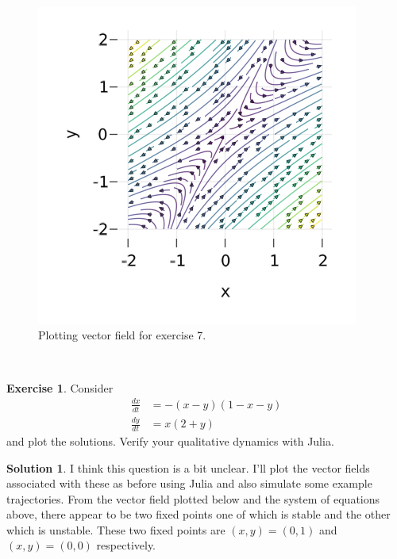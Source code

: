 \documentclass[12pt]{article}
\theoremstyle{definition}
\newtheorem{exer}{Exercise}
\newtheorem{sol}{Solution}
\theoremstyle{remark}
\begin{document}
  \begin{figure}[h]
     \centering
     \includegraphics[width=0.8\linewidth]{figs/hw-1-exer-7.png}
     \caption{Plotting vector field for exercise 7.}%
     \label{fig:exer-7}
 \end{figure}

\newpage

\

\newpage


\begin{exer}
Consider 
\begin{align*}
    \frac{dx}{dt} &= - (x - y) (1 - x - y)\\
    \frac{dy}{dt} &=x( 2 + y )
\end{align*}
and plot the solutions. Verify your qualitative dynamics with Julia.
\end{exer}

\begin{sol}\leavevmode
    I think this question is a bit unclear.  I'll plot the vector fields associated with these as before using Julia and also simulate some example trajectories. From the vector field plotted below and the system of equations above, there appear to be two fixed points one of which is stable and the other which is unstable. These two fixed points are $(x,y) = (0,1)$ and $(x,y) = (0,0)$ respectively.
 \end{sol}
\end{document}
